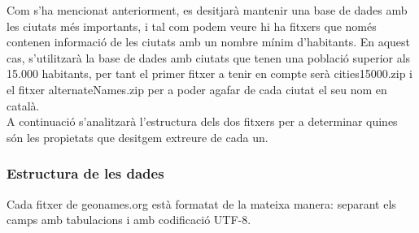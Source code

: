 \documentclass[12pt,a4paper,openright,oneside]{article}
\numberwithin{equation}{section}
\theoremstyle{definition}
\begin{document}
Com s'ha mencionat anteriorment, es desitjarà mantenir una base de dades amb les ciutats més importants, i tal com podem veure hi ha fitxers que només contenen informació de les ciutats amb un nombre mínim d'habitants. En aquest cas, s'utilitzarà la base de dades amb ciutats que tenen una població superior als 15.000 habitants, per tant el primer fitxer a tenir en compte serà cities15000.zip i el fitxer alternateNames.zip per a poder agafar de cada ciutat el seu nom en català.\\
A continuació s'analitzarà l'estructura dels dos fitxers per a determinar quines són les propietats que desitgem extreure de cada un.\cite{geonames}
\subsubsection*{Estructura de les dades}
Cada fitxer de geonames.org està formatat de la mateixa manera: separant els camps amb tabulacions i amb codificació UTF-8.\\
\newpage
\end{document}
